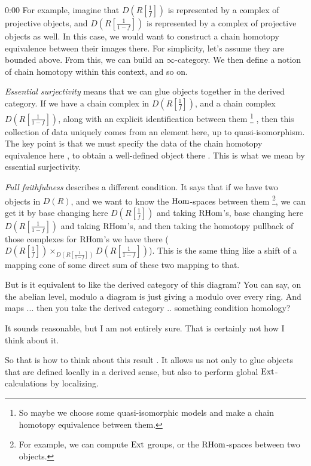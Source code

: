 \begin{unfinished}{0:00}
For example, imagine that $D(R[\frac{1}{f}])$ is represented by a complex of projective objects, and $D(R[\frac{1}{1-f}])$ is represented by a complex of projective objects as well. In this case, we would want to construct a chain homotopy equivalence between their images there. For simplicity, let's assume they are bounded above. From this, we can build an $\infty$-category. We then define a notion of chain homotopy within this context, and so on.

\emph{Essential surjectivity} means that we can glue objects together in the derived category. 
If we have a chain complex in $D(R[\frac{1}{f}])$, and a chain complex $D(R[\frac{1}{1-f}])$, along with an explicit identification between them \footnote{So maybe we choose some quasi-isomorphic models and make a chain homotopy equivalence between them.} , then this collection of data uniquely comes from an element here, up to quasi-isomorphism. 
The key point is that we must specify the data of the chain homotopy equivalence here , to obtain a well-defined object there . This is what we mean by essential surjectivity.

\emph{Full faithfulness} describes a different condition. It says that if we have two objects in $D(R)$, and we want to know the $\operatorname{Hom}$-spaces between them \footnote{For example, we can compute $\operatorname{Ext}$ groups, or the $\operatorname{RHom}$-spaces between two objects.}, we can get it by base changing here $D(R[\frac{1}{f}])$ and taking $\operatorname{RHom}$'s, base changing here $D(R[\frac{1}{1-f}])$ and taking $\operatorname{RHom}$'s, and then taking the homotopy pullback of those complexes for $\operatorname{RHom}$'s we have there ($D(R[\frac{1}{f}]) \times_{D(R[\frac{1}{1-f}])} D(R[\frac{1}{1-f}])$). This is the same thing like a shift of a mapping cone of some direct sum of these two mapping to that.

\ques But is it equivalent to like the derived category of this diagram? You can say, on the abelian level, modulo a diagram is just giving a modulo over every ring. And maps ... then you take the derived category .. something condition homology?

\ans It sounds reasonable, but I am not entirely sure. That is certainly not how I think about it.

So that is how to think about this result . It allows us not only to glue objects that are defined locally in a derived sense, but also to perform global $\operatorname{Ext}$-calculations by localizing.


\end{unfinished}
